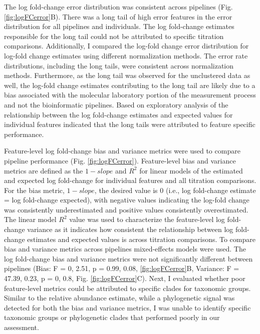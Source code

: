 \documentclass[smallextended]{svjour3}       %
\begin{document}
The log fold-change error distribution was consistent across pipelines
(Fig. \ref{fig:logFCerror}B). There was a long tail of high error
features in the error distribution for all pipelines and individuals.
The log fold-change estimates responsible for the long tail could not be
attributed to specific titration comparisons. Additionally, I compared
the log-fold change error distribution for log-fold change estimates
using different normalization methods. The error rate distributions,
including the long tails, were consistent across normalization methods.
Furthermore, as the long tail was observed for the unclustered data as
well, the log-fold change estimates contributing to the long tail are
likely due to a bias associated with the molecular laboratory portion of
the measurement process and not the bioinformatic pipelines. Based on
exploratory analysis of the relationship between the log fold-change
estimates and expected values for individual features indicated that the
long tails were attributed to feature specific performance.

Feature-level log fold-change bias and variance metrics were used to
compare pipeline performance (Fig. \ref{fig:logFCerror}). Feature-level
bias and variance metrics are defined as the \(1 - slope\) and \(R^2\)
for linear models of the estimated and expected log fold-change for
individual features and all titration comparisons. For the bias metric,
\(1 - slope\), the desired value is 0 (i.e., log fold-change estimate =
log fold-change expected), with negative values indicating the log-fold
change was consistently underestimated and positive values consistently
overestimated. The linear model \(R^2\) value was used to characterize
the feature-level log fold-change variance as it indicates how
consistent the relationship between log fold-change estimates and
expected values is across titration comparisons. To compare bias and
variance metrics across pipelines mixed-effects models were used. The
log fold-change bias and variance metrics were not significantly
different between pipelines (Bias: F = 0, 2.51, p = 0.99, 0.08,
\ref{fig:logFCerror}B, Variance: F = 47.39, 0.23, p = 0, 0.8, Fig.
\ref{fig:logFCerror}C). Next, I evaluated whether poor feature-level
metrics could be attributed to specific clades for taxonomic groups.
Similar to the relative abundance estimate, while a phylogenetic signal
was detected for both the bias and variance metrics, I was unable to
identify specific taxonomic groups or phylogenetic clades that performed
poorly in our assessment.
\end{document}
